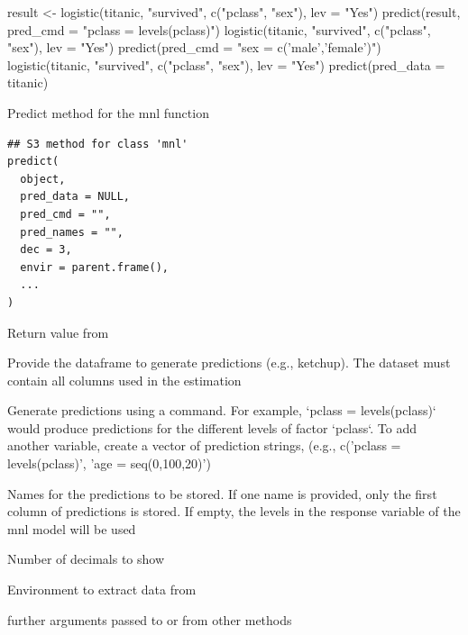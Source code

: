 \documentclass[a4paper]{book}
\begin{document}
%
\begin{Examples}
\begin{ExampleCode}
result <- logistic(titanic, "survived", c("pclass", "sex"), lev = "Yes")
predict(result, pred_cmd = "pclass = levels(pclass)")
logistic(titanic, "survived", c("pclass", "sex"), lev = "Yes") %
  predict(pred_cmd = "sex = c('male','female')")
logistic(titanic, "survived", c("pclass", "sex"), lev = "Yes") %
  predict(pred_data = titanic)
\end{ExampleCode}
\end{Examples}
%
\begin{Description}
Predict method for the mnl function
\end{Description}
%
\begin{Usage}
\begin{verbatim}
## S3 method for class 'mnl'
predict(
  object,
  pred_data = NULL,
  pred_cmd = "",
  pred_names = "",
  dec = 3,
  envir = parent.frame(),
  ...
)
\end{verbatim}
\end{Usage}
%
\begin{Arguments}
\begin{ldescription}
\item[\code{object}] Return value from 

\item[\code{pred\_data}] Provide the dataframe to generate predictions (e.g., ketchup). The dataset must contain all columns used in the estimation

\item[\code{pred\_cmd}] Generate predictions using a command. For example, `pclass = levels(pclass)` would produce predictions for the different levels of factor `pclass`. To add another variable, create a vector of prediction strings, (e.g., c('pclass = levels(pclass)', 'age = seq(0,100,20)')

\item[\code{pred\_names}] Names for the predictions to be stored. If one name is provided, only the first column of predictions is stored. If empty, the levels in the response variable of the mnl model will be used

\item[\code{dec}] Number of decimals to show

\item[\code{envir}] Environment to extract data from

\item[\code{...}] further arguments passed to or from other methods
\end{ldescription}
\end{Arguments}
\end{document}
